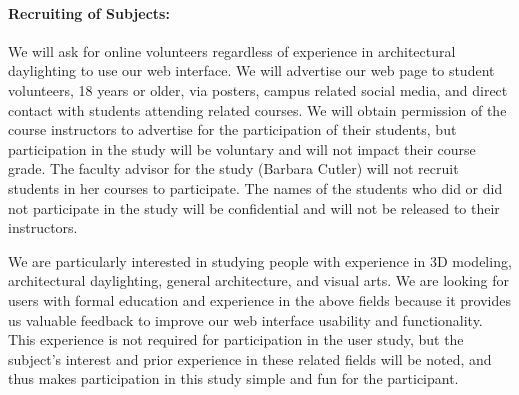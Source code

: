 \documentclass[12pt]{article}
\begin{document}
\paragraph{Recruiting of Subjects:}
We will ask for online volunteers regardless of experience in architectural 
daylighting to use our web interface. We will advertise our web page to student 
volunteers, 18 years or older, via posters, campus related social media, 
and direct contact with students attending related courses. We will obtain 
permission of the course instructors to advertise for the participation of their
students, but participation in the study will be voluntary and will not impact 
their course grade.  The faculty advisor for the study (Barbara Cutler) will 
not recruit students in her courses to participate.  The names of the 
students who did or did not participate in the study will be confidential 
and will not be released to their instructors.

We are particularly interested in studying people with experience in 3D modeling, 
architectural daylighting, general architecture, and visual arts.
We are looking for users with formal education and experience in the above fields
because it provides us valuable feedback to improve our web interface usability
and functionality. This experience is not required for participation 
in the user study, but the subject's interest and prior experience in 
these related fields will be noted, and thus makes participation in 
this study simple and fun for the participant.  

% 
\end{document}
